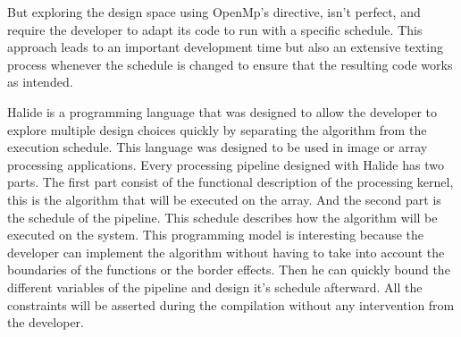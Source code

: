     But exploring the design space using OpenMp's directive, isn't perfect, and require the developer to adapt its code to run with a specific schedule. This approach leads to an important development time but also an extensive texting process whenever the schedule is changed to ensure that the resulting code works as intended.

    Halide is a programming language that was designed to allow the developer to explore multiple design choices quickly by separating the algorithm from the execution schedule. This language was designed to be used in image or array processing applications.
    Every processing pipeline designed with Halide has two parts. The first part consist of the functional description of the processing kernel, this is the algorithm that will be executed on the array. And the second part is the schedule of the pipeline. This schedule describes how the algorithm will be executed on the system. This programming model is interesting because the developer can implement the algorithm without having to take into account the boundaries of the functions or the border effects. Then he can quickly bound the different variables of the pipeline and design it's schedule afterward. All the constraints will be asserted during the compilation without any intervention from the developer.


